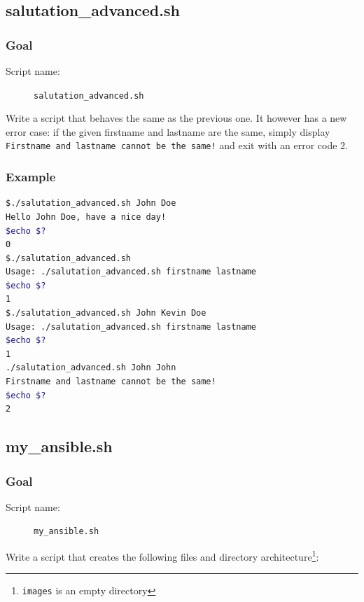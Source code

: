 \documentclass[12pt]{article}
\begin{document}
\subsection{salutation\_advanced.sh}

\subsubsection{Goal}

\begin{description}
    \item[Script name:] \texttt{salutation\_advanced.sh}
\end{description}

Write a script that behaves the same as the previous one. It however has a new error case: if the given firstname and lastname are the same, simply display \texttt{Firstname and lastname cannot be the same!} and exit with an error code 2.

\subsubsection{Example}

\begin{lstlisting}[language=bash]
$./salutation_advanced.sh John Doe
Hello John Doe, have a nice day!
$echo $?
0
$./salutation_advanced.sh 
Usage: ./salutation_advanced.sh firstname lastname
$echo $?
1
$./salutation_advanced.sh John Kevin Doe
Usage: ./salutation_advanced.sh firstname lastname
$echo $?
1
./salutation_advanced.sh John John
Firstname and lastname cannot be the same!
$echo $?
2
\end{lstlisting}

\subsection{my\_ansible.sh}

\subsubsection{Goal}

\begin{description}
    \item[Script name:] \texttt{my\_ansible.sh}
\end{description}

Write a script that creates the following files and directory architecture\footnote{\texttt{images} is an empty directory}:
\end{document}
